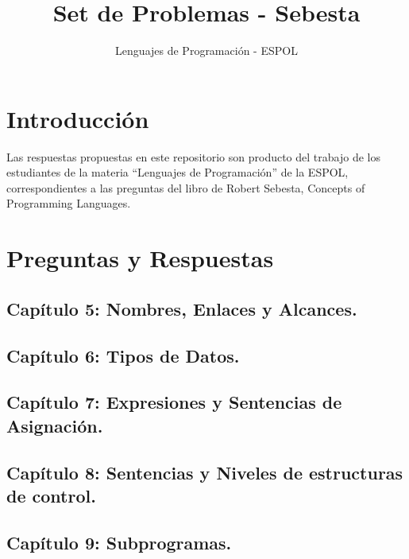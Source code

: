 \documentclass[12pt,oneside]{article}
\title{Set de Problemas - Sebesta}
\author{Lenguajes de Programación - ESPOL}
\begin{document}
\maketitle
\section{Introducción}
Las respuestas propuestas en este repositorio son producto del trabajo de los estudiantes de la materia ``Lenguajes de Programación'' de la ESPOL, correspondientes a las preguntas del libro de Robert Sebesta, Concepts of Programming Languages.
\section{Preguntas y Respuestas}
\subsection{Capítulo 5: Nombres, Enlaces y Alcances.}

\subsection{Capítulo 6: Tipos de Datos.}

\subsection{Capítulo 7: Expresiones y Sentencias de Asignación.}

\subsection{Capítulo 8: Sentencias y Niveles de estructuras de control.}

\subsection{Capítulo 9: Subprogramas.}

\end{document}
